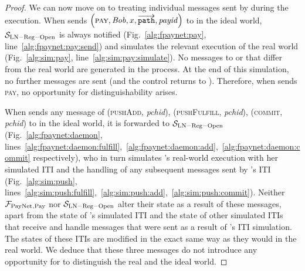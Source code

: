 \begin{proof}
  We can now move on to treating individual messages sent by \environment{}
  during the execution. When \environment{} sends $\left(\textsc{pay}, \mathit{Bob}, x,
  \overrightarrow{\mathtt{path}}, \mathit{payid}\right)$ to \alice{} in the
  ideal world, $\mathcal{S}_{\mathrm{LN - Reg - Open}}$ is always notified
  (Fig.~\ref{alg:fpaynet:pay}, line~\ref{alg:fpaynet:pay:send}) and simulates
  the relevant execution of the real world (Fig.~\ref{alg:sim:pay},
  line~\ref{alg:sim:pay:simulate}). No messages to \ledger{} or \environment{}
  that differ from the real world are generated in the process. At the end of
  this simulation, no further messages are sent (and the control returns to
  \environment). Therefore, when \environment{} sends \textsc{pay}, no
  opportunity for distinguishability arises.

  When \environment{} sends any message of (\textsc{pushAdd}, \textit{pchid}),
  (\textsc{pushFulfill}, \textit{pchid}), (\textsc{commit}, \textit{pchid}) to
  \alice{} in the ideal world, it is forwarded to $\mathcal{S}_{\mathrm{LN - Reg
  - Open}}$ (Fig.~\ref{alg:fpaynet:daemon},
  lines~\ref{alg:fpaynet:daemon:fulfill},~\ref{alg:fpaynet:daemon:add},~\ref{alg:fpaynet:daemon:commit}
  respectively), who in turn simulates \alice's real-world execution with her
  simulated ITI and the handling of any subsequent messages sent by \alice's ITI
  (Fig.~\ref{alg:sim:push},
  lines~\ref{alg:sim:push:fulfill},~\ref{alg:sim:push:add},~\ref{alg:sim:push:commit}).
  Neither $\mathcal{F}_{\mathrm{PayNet}}{}_{\mathrm{, Pay}}$ nor $\mathcal{S}_{\mathrm{LN - Reg -
  Open}}$ alter their state as a result of these messages, apart from the state
  of \alice's simulated ITI and the state of other simulated ITIs that receive
  and handle messages that were sent as a result of \alice's ITI simulation. The
  states of these ITIs are modified in the exact same way as they would in the
  real world. We deduce that these three messages do not introduce any
  opportunity for \environment{} to distinguish the real and the ideal world.


\end{proof}
